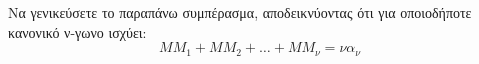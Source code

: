 \begin{alist}
\begin{figure}
        \caption*{}
    \end{figure}
    Να γενικεύσετε το παραπάνω συμπέρασμα, αποδεικνύοντας ότι για οποιοδήποτε κανονικό ν-γωνο ισχύει:
    \[
    MM_1 + MM_2 + \dots + MM_\nu = \nu\alpha_\nu
    \]
\end{alist}